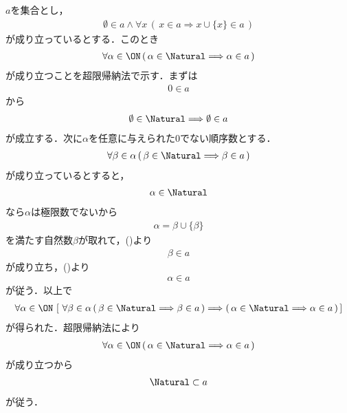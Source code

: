 	\begin{prf}
		$a$を集合とし，
		\begin{align}
			\emptyset \in a \wedge \forall x\, 
			(\, x \in a \Longrightarrow x \cup \{x\} \in a\, )
			\label{fom:thm_the_principle_of_mathematical_induction_1}
		\end{align}
		が成り立っているとする．このとき
		\begin{align}
			\forall \alpha \in \ON\, (\, \alpha \in \Natural \Longrightarrow \alpha \in a\, )
		\end{align}
		が成り立つことを超限帰納法で示す．まずは
		\begin{align}
			0 \in a
		\end{align}
		から
		\begin{align}
			\emptyset \in \Natural \Longrightarrow \emptyset \in a
		\end{align}
		が成立する．次に$\alpha$を任意に与えられた$0$でない順序数とする．
		\begin{align}
			\forall \beta \in \alpha\, (\, \beta \in \Natural \Longrightarrow \beta \in a\, )
			\label{fom:thm_the_principle_of_mathematical_induction_2}
		\end{align}
		が成り立っているとすると，
		\begin{align}
			\alpha \in \Natural
		\end{align}
		なら$\alpha$は極限数でないから
		\begin{align}
			\alpha = \beta \cup \{\beta\}
		\end{align}
		を満たす自然数$\beta$が取れて，()より
		\begin{align}
			\beta \in a
		\end{align}
		が成り立ち，()より
		\begin{align}
			\alpha \in a
		\end{align}
		が従う．以上で
		\begin{align}
			\forall \alpha \in \ON\, \left[\ 
				\forall \beta \in \alpha\, (\, \beta \in \Natural \Longrightarrow \beta \in a\, )
				\Longrightarrow (\, \alpha \in \Natural \Longrightarrow \alpha \in a\, )\, \right]
		\end{align}
		が得られた．超限帰納法により
		\begin{align}
			\forall \alpha \in \ON\, (\, \alpha \in \Natural \Longrightarrow \alpha \in a\, )
		\end{align}
		が成り立つから
		\begin{align}
			\Natural \subset a
		\end{align}
		が従う．
		\QED
	\end{prf}